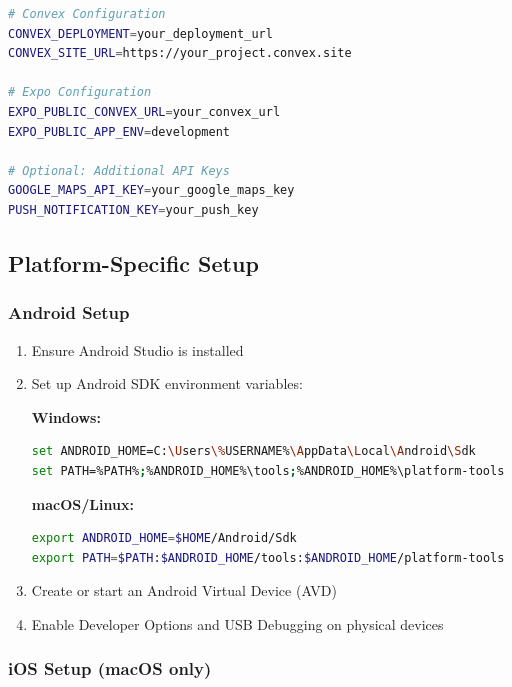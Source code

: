 \documentclass[a4paper,12pt]{article}
\begin{document}
\begin{lstlisting}[language=bash]
# Convex Configuration
CONVEX_DEPLOYMENT=your_deployment_url
CONVEX_SITE_URL=https://your_project.convex.site

# Expo Configuration  
EXPO_PUBLIC_CONVEX_URL=your_convex_url
EXPO_PUBLIC_APP_ENV=development

# Optional: Additional API Keys
GOOGLE_MAPS_API_KEY=your_google_maps_key
PUSH_NOTIFICATION_KEY=your_push_key
\end{lstlisting}

\subsection{Platform-Specific Setup}

\subsubsection{Android Setup}

\begin{enumerate}
    \item Ensure Android Studio is installed
    \item Set up Android SDK environment variables:
    
    \textbf{Windows:}
    \begin{lstlisting}[language=bash]
set ANDROID_HOME=C:\Users\%USERNAME%\AppData\Local\Android\Sdk
set PATH=%PATH%;%ANDROID_HOME%\tools;%ANDROID_HOME%\platform-tools
    \end{lstlisting}
    
    \textbf{macOS/Linux:}
    \begin{lstlisting}[language=bash]
export ANDROID_HOME=$HOME/Android/Sdk
export PATH=$PATH:$ANDROID_HOME/tools:$ANDROID_HOME/platform-tools
    \end{lstlisting}
    
    \item Create or start an Android Virtual Device (AVD)
    \item Enable Developer Options and USB Debugging on physical devices
\end{enumerate}

\subsubsection{iOS Setup (macOS only)}
\end{document}
